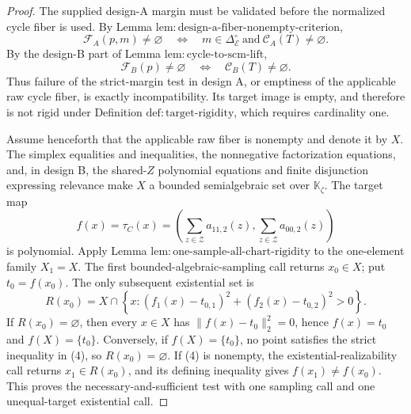 \documentclass{article}
\begin{document}
\begin{proof}
The supplied design-A margin must be validated before the normalized cycle fiber is used.  By Lemma \(\mathrm{lem{:}design\text{-}a\text{-}fiber\text{-}nonempty\text{-}criterion}\),
\[
 \mathcal F_A(p,m)\ne\varnothing
 \quad\Longleftrightarrow\quad
 m\in\Delta_{\mathcal E}^{\circ}
 \ \text{and}\ 
 \mathcal C_A(T)\ne\varnothing .                         \tag{1}
\]
By the design-B part of Lemma \(\mathrm{lem{:}cycle\text{-}to\text{-}scm\text{-}lift}\),
\[
 \mathcal F_B(p)\ne\varnothing
 \quad\Longleftrightarrow\quad
 \mathcal C_B(T)\ne\varnothing .                         \tag{2}
\]
Thus failure of the strict-margin test in design A, or emptiness of the applicable raw cycle fiber, is exactly incompatibility.  Its target image is empty, and therefore is not rigid under Definition \(\mathrm{def{:}target\text{-}rigidity}\), which requires cardinality one.

Assume henceforth that the applicable raw fiber is nonempty and denote it by \(X\).  The simplex equalities and inequalities, the nonnegative factorization equations, and, in design B, the shared-\(Z\) polynomial equations and finite disjunction expressing relevance make \(X\) a bounded semialgebraic set over \(\mathbb K_{\zeta}\).  The target map
\[
 f(x)=\tau_C(x)
 =\left(\sum_{z\in\mathcal Z}a_{11,2}(z),
          \sum_{z\in\mathcal Z}a_{00,2}(z)\right)        \tag{3}
\]
is polynomial.  Apply Lemma \(\mathrm{lem{:}one\text{-}sample\text{-}all\text{-}chart\text{-}rigidity}\) to the one-element family \(X_1=X\).  The first bounded-algebraic-sampling call returns \(x_0\in X\); put \(t_0=f(x_0)\).  The only subsequent existential set is
\[
 R(x_0)=X\cap
 \left\{x:
   (f_1(x)-t_{0,1})^2+(f_2(x)-t_{0,2})^2>0
 \right\}.                                                \tag{4}
\]
If \(R(x_0)=\varnothing\), then every \(x\in X\) has \(\|f(x)-t_0\|_2^2=0\), hence \(f(x)=t_0\) and \(f(X)=\{t_0\}\).  Conversely, if \(f(X)=\{t_0\}\), no point satisfies the strict inequality in (4), so \(R(x_0)=\varnothing\).  If (4) is nonempty, the existential-realizability call returns \(x_1\in R(x_0)\), and its defining inequality gives \(f(x_1)\ne f(x_0)\).  This proves the necessary-and-sufficient test with one sampling call and one unequal-target existential call.


\end{proof}
\end{document}
